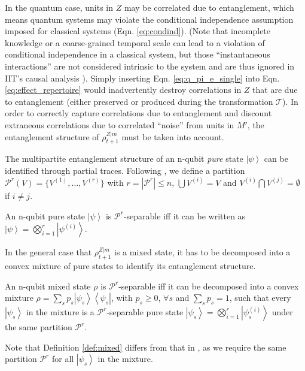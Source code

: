\documentclass[preprints, article, accept, pdftex, moreauthors, letterpaper]{Definitions/mdpi}
\newcommand{\ket}[1]{\left| #1 \right>} %
\newcommand{\bra}[1]{\left< #1 \right|} %
\renewcommand{\=}[1]{\stackrel{#1}{=}} %
\newcommand{\T}{\mathcal{T}} %
\renewcommand{\*}{\otimes}%
\begin{document}
In the quantum case, units in $Z$ may be correlated due to entanglement, which means quantum systems may violate the conditional independence assumption imposed for classical systems (Eqn. \ref{eq:condind}). (Note that incomplete knowledge or a coarse-grained temporal scale can lead to a violation of conditional independence in a classical system, but those ``instantaneous interactions'' are not considered intrinsic to the system and are thus ignored in IIT's causal analysis \cite{Marshall2018}).
Simply inserting Eqn. \eqref{eq:q_pi_e_single} into Eqn. \eqref{eq:effect_repertoire} would inadvertently destroy correlations in $Z$ that are due to entanglement (either preserved or produced during the transformation $\T$). 
In order to correctly capture correlations due to entanglement and discount extraneous correlations due to correlated ``noise'' from units in $M'$, the entanglement structure of $\rho^{Z|m}_{t+1}$ must be taken into account. 

The multipartite entanglement structure of an n-qubit \textit{pure} state $\ket{\psi}$ can be identified through partial traces. 
Following \cite{Zhou2019}, we define a partition $\mathcal{P}^r(V) = \{V^{(1)}, \dots, V^{(r)}\}$ with $r = |\mathcal{P}^r| \leq n$, $\bigcup V^{(i)} = V$ and $V^{(i)} \bigcap V^{(j)} = \emptyset$ if $i \neq j$.

\begin{Definition}
An n-qubit pure state $\ket{\psi}$ is $\mathcal{P}^r$-separable iff it can be written as $\ket{\psi} = \bigotimes_{i=1}^r \ket{\psi^{(i)}}$.
\end{Definition}

In the general case that $\rho^{Z|m}_{t+1}$ is a mixed state, it has to be decomposed into a convex mixture of pure states to identify its entanglement structure. 

\begin{Definition}
\label{def:mixed}
An n-qubit mixed state $\rho$ is $\mathcal{P}^r$-separable iff it can be decomposed into a convex mixture $\rho = \sum_s p_s \ket{\psi_s}\bra{\psi_s}$, with $p_s \geq 0$, $\forall s$ and $\sum_s p_s = 1$, such that every $\ket{\psi_s}$ in the mixture is a $\mathcal{P}^r$-separable pure state $\ket{\psi_s} = \bigotimes_{i=1}^r \ket{\psi_s^{(i)}}$ under the same partition $\mathcal{P}^r$. 
\end{Definition}
%
Note that Definition \eqref{def:mixed} differs from that in \cite{Zhou2019}, as we require the same partition $\mathcal{P}^r$ for all $\ket{\psi_s}$ in the mixture.
\end{document}
